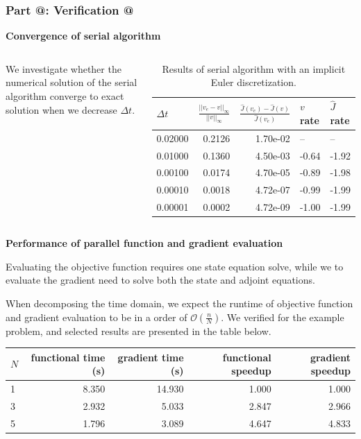 \documentclass[9pt]{beamer}
\makeatletter
\newcommand*{\rom}[1]{\expandafter\@slowromancap\romannumeral #1@}
\makeatother
\begin{document}
\begin{frame}
\frametitle{\textbf{ Part \rom{5}:} Verification \rom{3}}
\textbf{Convergence of serial algorithm}
\begin{columns}
\begin{itemize}
{\small
\item{We investigate whether the numerical solution of the serial algorithm converge to exact solution when we decrease $\Delta t$.}
}
\end{itemize}
{\tiny
\begin{table}[!h]
\caption{{\tiny Results of serial algorithm with an implicit Euler discretization.}} \label{IE_convergence}
\centering
\begin{tabular}{lrrll}
\toprule
{} $\Delta t$&    $\frac{||v_e-v||_{\infty}}{||v||_{\infty}}$ &  $\frac{\hat J(v_e)-\hat J(v)}{\hat J(v_e)}$ & $v$ rate & $\hat J$  rate \\
\midrule
0.02000 &  0.2126 &  1.70e-02 &        -- &       -- \\
0.01000 &  0.1360 &  4.50e-03 & -0.64 & -1.92 \\
0.00100 &  0.0174 &  4.70e-05 & -0.89 & -1.98 \\
0.00010 &  0.0018 &  4.72e-07 &   -0.99 & -1.99 \\
0.00001 &  0.0002 &  4.72e-09 &  -1.00 & -1.99 \\
\bottomrule
\end{tabular}
\end{table}}
\end{columns}
\textbf{Performance of parallel function and gradient evaluation}
\begin{itemize}
{\small
\item{Evaluating the objective function requires one state equation solve, while we to evaluate the gradient need to solve both the state and adjoint equations.}
\item{When decomposing the time domain, we expect the runtime of objective function and gradient evaluation to be in a order of $\mathcal{O}(\frac{n}{N})$. We verified for the example problem, and selected results are presented in the table below. }}
\end{itemize}
{\tiny
\begin{table}[!h]
\centering
\begin{tabular}{lrrrr}
\toprule
{}$N$ &  functional time (s) &  gradient time (s) &  functional speedup &  gradient speedup \\
\midrule
1 &           8.350 &         14.930 &            1.000 &          1.000 \\
3 &           2.932 &          5.033 &            2.847 &          2.966 \\
5 &           1.796 &          3.089 &            4.647 &          4.833 \\
\bottomrule
\end{tabular}
\end{table}}
\end{frame}
\end{document}
